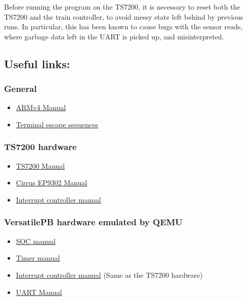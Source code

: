 Before running the program on the TS7200, it is necessary to reset both
the TS7200 and the train controller, to avoid messy state left behind by
previous runs. In particular, this has been known to cause bugs with the
sensor reads, where garbage data left in the UART is picked up, and
misinterpreted.

\subsection{Useful links:}\label{useful-links}

\subsubsection{General}\label{general}

\begin{itemize}
\itemsep1pt\parskip0pt
\item
  \href{http://www.cgl.uwaterloo.ca/~wmcowan/teaching/cs452/pdf/arm-architecture.pdf}{ARMv4
  Manual}
\item
  \href{http://ascii-table.com/ansi-escape-sequences.php}{Terminal
  escape sequences}
\end{itemize}

\subsubsection{TS7200 hardware}\label{ts7200-hardware}

\begin{itemize}
\itemsep1pt\parskip0pt
\item
  \href{http://www.cgl.uwaterloo.ca/~wmcowan/teaching/cs452/pdf/ts-7200-manual.pdf}{TS7200
  Manual}
\item
  \href{http://www.cgl.uwaterloo.ca/~wmcowan/teaching/cs452/pdf/ep93xx-user-guide.pdf}{Cirrus
  EP9302 Manual}
\item
  \href{http://www.cgl.uwaterloo.ca/~wmcowan/teaching/cs452/pdf/icu-pl190.pdf}{Interrupt
  controller manual}
\end{itemize}

\subsubsection{VersatilePB hardware emulated by
QEMU}\label{versatilepb-hardware-emulated-by-qemu}

\begin{itemize}
\itemsep1pt\parskip0pt
\item
  \href{http://infocenter.arm.com/help/topic/com.arm.doc.dui0224i/DUI0224I_realview_platform_baseboard_for_arm926ej_s_ug.pdf}{SOC
  manual}
\item
  \href{http://infocenter.arm.com/help/topic/com.arm.doc.ddi0271d/DDI0271.pdf}{Timer
  manual}
\item
  \href{http://infocenter.arm.com/help/topic/com.arm.doc.ddi0181e/DDI0181.pdf}{Interrupt
  controller manual} (Same as the TS7200 hardware)
\item
  \href{http://infocenter.arm.com/help/topic/com.arm.doc.ddi0183f/DDI0183.pdf}{UART
  Manual}
\end{itemize}
